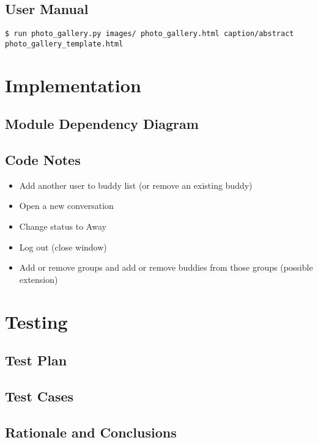 \documentclass[11pt,letterpaper]{article}
\begin{document}
\subsection{User Manual}
\begin{verbatim}
$ run photo_gallery.py images/ photo_gallery.html caption/abstract photo_gallery_template.html
\end{verbatim}

\section{Implementation}

\subsection{Module Dependency Diagram}
\subsection{Code Notes}


\begin{itemize}
\item Add another user to buddy list (or remove an existing buddy) 
\item Open a new conversation
\item Change status to Away
\item Log out (close window)
\item Add or remove groups and add or remove buddies from those groups (possible extension)
\end{itemize}



\section{Testing}

\subsection{Test Plan}
\subsection{Test Cases}
\subsection{Rationale and Conclusions}
\end{document}
